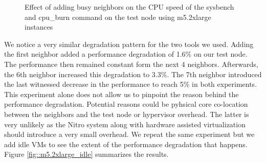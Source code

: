 \begin{figure}[H]
\centering
{}
\caption{Effect of adding busy neighbors on the CPU speed of the sysbench and cpu\_burn command on the 
test node using m5.2xlarge instances}
\label{fig::m5.2xlarge_busy}
\end{figure}
\noindent
We notice a very similar degradation pattern for the two tools we used.
Adding the first neighbor added a performance degradation of  1.6\% on our test node. The performance then 
remained constant form the next 4 neighbors. Afterwards, the 6th neighbor increased this degradation to 
3.3\%. The 7th neighbor introduced the last witnessed decrease in the performance to reach 5\% in both 
experiments. \\ 
This experiment alone does not allow us to pinpoint the reason behind the performance degradation.
Potential reasons could be pyhsical core co-location between the neighbors and the test node or 
hypervisor overhead. The latter is very unlikely as the Nitro system along with hardware assisted 
virtualization should introduce a very small overhead. 
We repeat the same experiment but we add idle VMs to see the extent of the performance degradation that 
happens. Figure \ref{fig::m5.2xlarge_idle} summarizes the results. 


